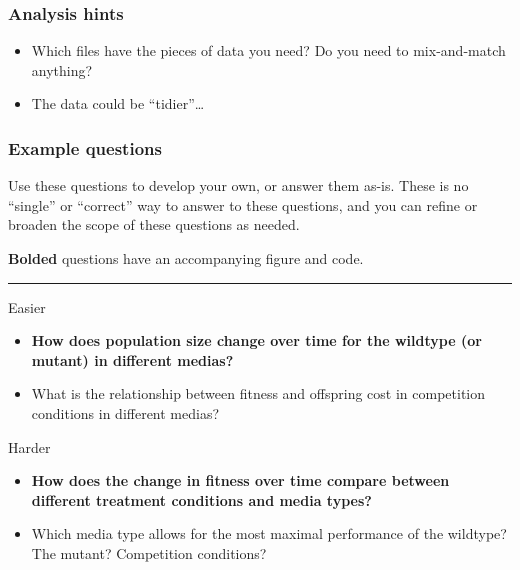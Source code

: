 \documentclass[
  letterpaper,
  DIV=11,
  numbers=noendperiod]{scrreprt}
\providecommand{\tightlist}{%
  \setlength{\itemsep}{0pt}\setlength{\parskip}{0pt}}\usepackage{longtable,booktabs,array}
\begin{document}
\begin{tcolorbox}[enhanced jigsaw, bottomtitle=1mm, bottomrule=.15mm, toprule=.15mm, opacityback=0, leftrule=.75mm, breakable, colback=white, toptitle=1mm, left=2mm, coltitle=black, titlerule=0mm, opacitybacktitle=0.6, title=\textcolor{quarto-callout-tip-color}{\faLightbulb}\hspace{0.5em}{Analysis ideas and hints}, rightrule=.15mm, arc=.35mm, colframe=quarto-callout-tip-color-frame, colbacktitle=quarto-callout-tip-color!10!white]

\subsubsection{Analysis hints}

\begin{itemize}
\item
  Which files have the pieces of data you need? Do you need to
  mix-and-match anything?
\item
  The data could be ``tidier''\ldots{}
\end{itemize}

\subsubsection{Example questions}

Use these questions to develop your own, or answer them as-is. These is
no ``single'' or ``correct'' way to answer to these questions, and you
can refine or broaden the scope of these questions as needed.

\textbf{Bolded} questions have an accompanying figure and code.

\begin{center}\rule{0.5\linewidth}{0.5pt}\end{center}

Easier

\begin{itemize}
\tightlist
\item
  \textbf{How does population size change over time for the wildtype (or
  mutant) in different medias?}
\item
  What is the relationship between fitness and offspring cost in
  competition conditions in different medias?
\end{itemize}

Harder

\begin{itemize}
\tightlist
\item
  \textbf{How does the change in fitness over time compare between
  different treatment conditions and media types?}
\item
  Which media type allows for the most maximal performance of the
  wildtype? The mutant? Competition conditions?
\end{itemize}


\end{tcolorbox}
\end{document}
